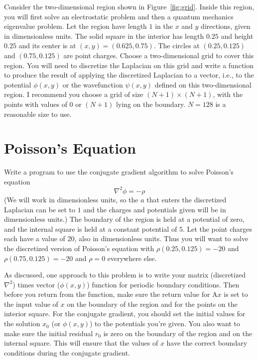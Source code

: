 

Consider the two-dimensional region shown in Figure~\ref{fig:grid}.
Inside this region, you will first
solve an electrostatic problem and then a quantum mechanics eigenvalue problem. Let the
region have length \(1\) in the \(x\) and \(y\) directions, given in dimensionless units.
The solid square in the interior has length \(0.25\) and height \(0.25\) and its center is
at \((x, y) = (0.625, 0.75)\). The circles at \((0.25, 0.125)\) and \((0.75, 0.125)\) are
point charges. Choose a two-dimensional grid to cover this region. You will need to
discretize the Laplacian on this grid and write a function to produce the result of applying
the discretized Laplacian to a vector, i.e., to the potential \(\phi(x, y)\) or the
wavefunction \(\psi(x, y)\) defined on this two-dimensional region. I recommend you choose a
grid of size \((N + 1) \times (N + 1)\), with the points with values of \(0\) or \((N + 1)\)
lying on the boundary. \(N = 128\) is a reasonable size to use.

\section{Poisson's Equation}\label{sec:pe}

Write a program to use the conjugate gradient algorithm to solve Poisson's equation
%
\begin{equation}
    \nabla^2 \phi = -\rho
\end{equation}
%
(We will work in dimensionless units, so the \(a\) that enters the discretized Laplacian can be
set to \(1\) and the charges and potentials given will be in dimensionless units.) The
boundary of the region is held at a potential of zero, and the internal square is held at a
constant potential of \(5\). Let the point charges each have a value of \(20\), also in
dimensionless units. Thus you will want to solve the discretized version of Poisson's
equation with \(\rho(0.25, 0.125) = -20\) and \(\rho(0.75, 0.125) = -20\) and \(\rho = 0\)
everywhere else.

As discussed, one approach to this problem is to write your matrix
(discretized \(\nabla^2\)) times vector (\(\phi(x, y)\)) function for periodic boundary
conditions. Then before you return from the function, make sure the return value for
\(\mathrm{ A } x\) is set to the input value of \(x\) on the boundary of the region and for
the points on the interior square. For the conjugate gradient, you should set the initial
values for the solution \(x_0\) (or \(\phi(x, y)\)) to the potentials you're given. You also
want to make sure the initial residual \(r_0\) is zero on the boundary of the region and on
the internal square. This will ensure that the values of \(x\) have the correct boundary
conditions during the conjugate gradient.


